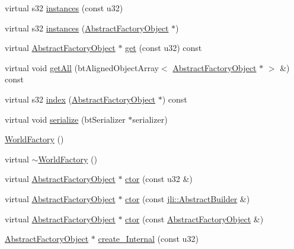 \begin{DoxyCompactItemize}
virtual s32 \hyperlink{classjli_1_1_world_factory_a6305d49494b83a45f77c4065efe595d3}{instances} (const u32)
\item 
virtual s32 \hyperlink{classjli_1_1_world_factory_a352be79efeb80d15cf9e7c9cafc8d47a}{instances} (\hyperlink{classjli_1_1_abstract_factory_object}{Abstract\+Factory\+Object} $\ast$)
\item 
virtual \hyperlink{classjli_1_1_abstract_factory_object}{Abstract\+Factory\+Object} $\ast$ \hyperlink{classjli_1_1_world_factory_a44235d0cb9e7e11fa7df8b2c7c84e77b}{get} (const u32) const 
\item 
virtual void \hyperlink{classjli_1_1_world_factory_afc3c3ab16e547f8efb70df6c0a6c9acc}{get\+All} (bt\+Aligned\+Object\+Array$<$ \hyperlink{classjli_1_1_abstract_factory_object}{Abstract\+Factory\+Object} $\ast$ $>$ \&) const 
\item 
virtual s32 \hyperlink{classjli_1_1_world_factory_a36ed5d3e23a486003b5490dbd117c308}{index} (\hyperlink{classjli_1_1_abstract_factory_object}{Abstract\+Factory\+Object} $\ast$) const 
\item 
virtual void \hyperlink{classjli_1_1_world_factory_a4cb7bc0a2b06508944575416716a2630}{serialize} (bt\+Serializer $\ast$serializer)
\item 
\hyperlink{classjli_1_1_world_factory_aa0743bb8d687c225a725d68360c84cee}{World\+Factory} ()
\item 
virtual \hyperlink{classjli_1_1_world_factory_ab07df554e2f6d0777470dc426020ceeb}{$\sim$\+World\+Factory} ()
\item 
virtual \hyperlink{classjli_1_1_abstract_factory_object}{Abstract\+Factory\+Object} $\ast$ \hyperlink{classjli_1_1_world_factory_a1651da687bf991ffafa8f02bc3eb9707}{ctor} (const u32 \&)
\item 
virtual \hyperlink{classjli_1_1_abstract_factory_object}{Abstract\+Factory\+Object} $\ast$ \hyperlink{classjli_1_1_world_factory_a0b8a82380ee533205802acb2c58af331}{ctor} (const \hyperlink{classjli_1_1_abstract_builder}{jli\+::\+Abstract\+Builder} \&)
\item 
virtual \hyperlink{classjli_1_1_abstract_factory_object}{Abstract\+Factory\+Object} $\ast$ \hyperlink{classjli_1_1_world_factory_a62f73f5ea8689adf2652de1111f05915}{ctor} (const \hyperlink{classjli_1_1_abstract_factory_object}{Abstract\+Factory\+Object} \&)
\item 
\hyperlink{classjli_1_1_abstract_factory_object}{Abstract\+Factory\+Object} $\ast$ \hyperlink{classjli_1_1_world_factory_a950011f467778776bffd2fe0a149293a}{create\+\_\+\+Internal} (const u32)

\end{DoxyCompactItemize}
